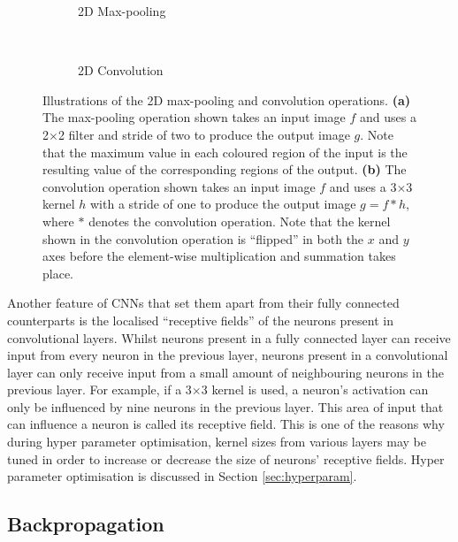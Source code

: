 \begin{figure}[t]
    \centering
    \begin{subfigure}[t]{0.43\textwidth}
        \centering
        
    \vspace*{1mm}
    \caption{2D Max-pooling}
    \end{subfigure}
    ~
    \begin{subfigure}[t]{0.55\textwidth}
        \centering
        
        \vspace*{1mm}
        \caption{2D Convolution}
    \end{subfigure}
    \caption{Illustrations of the 2D max-pooling and convolution operations. \textbf{(a)} The max-pooling operation shown takes an input image $f$ and uses a 2$\times$2 filter and stride of two to produce the output image $g$. Note that the maximum value in each coloured region of the input is the resulting value of the corresponding regions of the output. \textbf{(b)} The convolution operation shown takes an input image $f$ and uses a 3$\times$3 kernel $h$ with a stride of one to produce the output image $g=f\ast h$, where $\ast$ denotes the convolution operation. Note that the kernel shown in the convolution operation is ``flipped'' in both the $x$ and $y$ axes before the element-wise multiplication and summation takes place.}
    \label{fig:operations}
\end{figure}

Another feature of CNNs that set them apart from their fully connected counterparts is the localised ``receptive fields'' of the neurons present in convolutional layers. Whilst neurons present in a fully connected layer can receive input from every neuron in the previous layer, neurons present in a convolutional layer can only receive input from a small amount of neighbouring neurons in the previous layer. For example, if a 3$\times$3 kernel is used, a neuron's activation can only be influenced by nine neurons in the previous layer. This area of input that can influence a neuron is called its receptive field. This is one of the reasons why during hyper parameter optimisation, kernel sizes from various layers may be tuned in order to increase or decrease the size of neurons' receptive fields. Hyper parameter optimisation is discussed in Section \ref{sec:hyperparam}.

\subsection{Backpropagation}
\label{sec:backprop}

